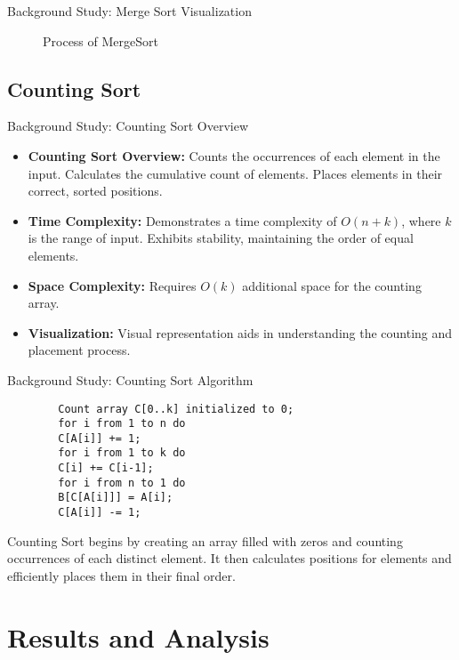 \documentclass{beamer}
\begin{document}
\begin{frame}{Background Study: Merge Sort Visualization}
	\begin{figure}
		\centering
		\caption{Process of MergeSort}
		\label{fig:enter-label}
	\end{figure}
\end{frame}

\subsection{Counting Sort}

\begin{frame}{Background Study: Counting Sort Overview}
	\begin{itemize}
		\item \textbf{Counting Sort Overview:} Counts the occurrences of each element in the input. Calculates the cumulative count of elements. Places elements in their correct, sorted positions.
		\item \textbf{Time Complexity:} Demonstrates a time complexity of $O(n + k)$, where $k$ is the range of input. Exhibits stability, maintaining the order of equal elements.
		\item \textbf{Space Complexity:} Requires $O(k)$ additional space for the counting array.
		\item \textbf{Visualization:} Visual representation aids in understanding the counting and placement process.
	\end{itemize}
\end{frame}

\begin{frame}[fragile]{Background Study: Counting Sort Algorithm}
	\begin{verbatim}
		Count array C[0..k] initialized to 0;
		for i from 1 to n do
		C[A[i]] += 1;
		for i from 1 to k do
		C[i] += C[i-1];
		for i from n to 1 do
		B[C[A[i]]] = A[i];
		C[A[i]] -= 1;
	\end{verbatim}
	Counting Sort begins by creating an array filled with zeros and counting occurrences of each distinct element. It then calculates positions for elements and efficiently places them in their final order.\cite{geeksforgeeks-counting-sort}
\end{frame}

	
\section{Results and Analysis}
\end{document}
